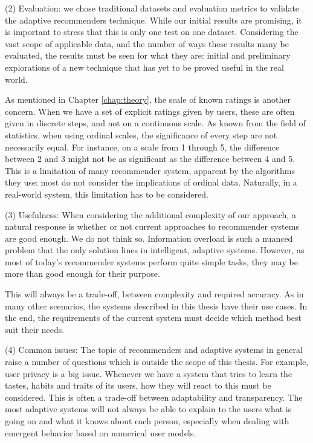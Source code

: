 (2) Evaluation: we chose traditional datasets and evaluation metrics
to validate the adaptive recommenders technique.
While our initial results are promising, it is important to stress
that this is only one test on one dataset. Considering the vast scope
of applicable data, and the number of ways these results many be 
evaluated, the results must be seen for what they are:
initial and preliminary explorations of a new technique
that has yet to be proved useful in the real world.

As mentioned in Chapter \ref{chap:theory}, the scale of known ratings is another concern.
When we have a set of explicit ratings given by users, these are often
given in discrete steps, and not on a continuous scale.
As known from the field of statistics, when using ordinal scales,
the significance of every step are not necessarily equal.
For instance, on a scale from 1 through 5, the difference
between 2 and 3 might not be as significant as the difference between 4 and 5.
This is a limitation of many recommender system, apparent by the algorithms they use:
most do not consider the implications of ordinal data.
Naturally, in a real-world system, this limitation has to be considered.

(3) Usefulness:
When considering the additional complexity of our approach,
a natural response is whether or not current approaches
to recommender systems are good enough.
We do not think so. Information overload is such a nuanced problem 
that the only solution lines in intelligent, adaptive systems.
However, as most of today's recommender systems 
perform quite simple tasks, they may be more
than good enough for their purpose.

This will always be a trade-off, between complexity and required accuracy.
As in many other scenarios, the systems described in this thesis
have their use cases. In the end, the requirements of the current system
must decide which method best suit their needs.

(4) Common issues:
The topic of recommenders and adaptive systems in general
raise a number of questions which is outside the scope of this thesis.
For example, user privacy is a big issue.
Whenever we have a system that tries to learn the tastes, habits and
traits of its users, how they will react to this must be considered.
This is often a trade-off between adaptability and transparency.
The most adaptive systems will not always be able to explain to the users
what is going on and what it knows about each person,
especially when dealing with emergent behavior based on 
numerical user models.

